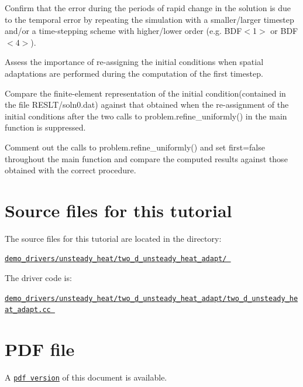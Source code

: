 \begin{DoxyEnumerate}
\item Confirm that the error during the periods of rapid change in the solution is due to the temporal error by repeating the simulation with a smaller/larger timestep and/or a time-\/stepping scheme with higher/lower order (e.\+g. B\+D\+F$<$1$>$ or B\+D\+F$<$4$>$).
\item Assess the importance of re-\/assigning the initial conditions when spatial adaptations are performed during the computation of the first timestep.
\begin{DoxyEnumerate}
\item Compare the finite-\/element representation of the initial condition(contained in the file {\ttfamily R\+E\+S\+L\+T/soln0.\+dat}) against that obtained when the re-\/assignment of the initial conditions after the two calls to {\ttfamily problem.\+refine\+\_\+uniformly()} in the {\ttfamily main} function is suppressed.
\item Comment out the calls to {\ttfamily problem.\+refine\+\_\+uniformly()} and set {\ttfamily first=false} throughout the {\ttfamily main} function and compare the computed results against those obtained with the correct procedure.
\end{DoxyEnumerate}
\end{DoxyEnumerate}



 

\hypertarget{index_sources}{}\section{Source files for this tutorial}\label{index_sources}

\begin{DoxyItemize}
\item The source files for this tutorial are located in the directory\+: \begin{center} \href{
../../../../
demo_drivers/unsteady_heat/two_d_unsteady_heat_adapt/
}{\tt demo\+\_\+drivers/unsteady\+\_\+heat/two\+\_\+d\+\_\+unsteady\+\_\+heat\+\_\+adapt/ } \end{center} 
\item The driver code is\+: \begin{center} \href{
../../../../
demo_drivers/unsteady_heat/two_d_unsteady_heat_adapt/two_d_unsteady_heat_adapt.cc
}{\tt demo\+\_\+drivers/unsteady\+\_\+heat/two\+\_\+d\+\_\+unsteady\+\_\+heat\+\_\+adapt/two\+\_\+d\+\_\+unsteady\+\_\+heat\+\_\+adapt.\+cc } \end{center} 
\end{DoxyItemize}



 

 \hypertarget{index_pdf}{}\section{P\+D\+F file}\label{index_pdf}
A \href{../latex/refman.pdf}{\tt pdf version} of this document is available. 
